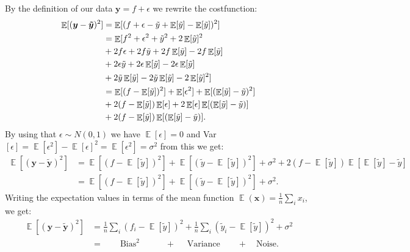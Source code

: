 \documentclass[11pt]{article}
\DeclareMathOperator*{\E}{\mathbb{E}}
\begin{document}
By the definition of our data $\boldsymbol{y} = f +\epsilon$ we rewrite the costfunction:
\begin{align*}
    \E[(\boldsymbol{y}- \boldsymbol{\tilde{y}})^2] & = \E[(f + \epsilon - \tilde{y} + \E[\tilde{y}]- \E[\tilde{y}])^2]                \\                                             &= \E[f^2 + \epsilon^2 + \tilde{y}^2 + 2\E[\tilde{y}]^2 \\
                                                   & + 2f\epsilon + 2f\tilde{y} + 2f\E[\tilde{y}] - 2f\E[\tilde{y}]                   \\
                                                   & + 2\epsilon\tilde{y} + 2\epsilon \E[\tilde{y}] - 2\epsilon \E[\tilde{y}]         \\
                                                   & + 2\tilde{y}\E[\tilde{y}] - 2\tilde{y}\E[\tilde{y}] -2\E[\tilde{y}]^2]           \\
                                                   & = \E[(f-\E[\Tilde{y}])^2] + \E[\epsilon^2] + \E[( \E[\Tilde{y}] - \Tilde{y} )^2] \\
                                                   & + 2(f-\E[\tilde{y}])\E[\epsilon]+2\E[\epsilon]\E[(\E[\tilde{y}]-\tilde{y} )]     \\
                                                   & + 2(f-\E[\tilde{y}])\E[( \E[\tilde{y}] - \tilde{y} )].
\end{align*}
By using that $\epsilon \sim N(0,1)$ we have $\E[\epsilon] = 0$ and Var$[\epsilon] = \E[\epsilon^2]- \E[\epsilon]^2 = \E[\epsilon^2]=\sigma^2$ from this we get:
\begin{align*}
    \E[(\boldsymbol{y}- \boldsymbol{\tilde{y}})^2] & =\E[(f -\E[\tilde{y}])^2] +\E[( \tilde{y} -\E[\tilde{y}])^2]  + \sigma^2+ 2(f-\E[\tilde{y}])\E[\E[\tilde{y}] -\tilde{y}] \\
                                                   & =\E[(f -\E[\tilde{y}])^2]  + \E[( \tilde{y} -\E[\tilde{y}])^2]+\sigma^2.
\end{align*}
Writing the expectation values in terms of the mean function $\E(\boldsymbol{x}) = \frac{1}{n}\sum_{i} x_i$, we get:
\begin{align*}
    \E[(\boldsymbol{y}- \boldsymbol{\tilde{y}})^2] & = \frac{1}{n}\sum_i (f_i - \E[\tilde{y}])^2 + \frac{1}{n} \sum_i ( \tilde{y}_i - \E[\tilde{y}])^2 + \sigma^2 \\ &= \quad\quad \text{Bias}^2 \quad\quad\quad + \quad \text{ Variance} \quad\quad + \quad \text{Noise}.
\end{align*}
\end{document}
